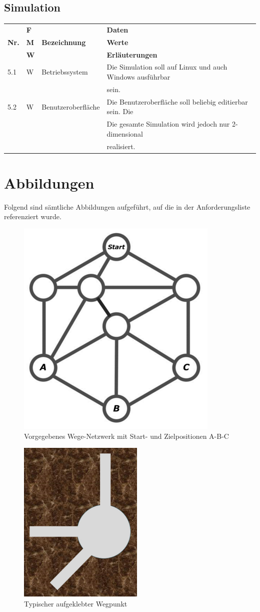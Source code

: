 \documentclass[11pt, a4paper]{article}
\begin{document}
\subsection{Simulation}
    \begin{tabular}{|l|l|l|l|}
    \hline
    & \textbf{F} & & \textbf{Daten} \\
    \textbf{Nr.} & \textbf{M} & \textbf{Bezeichnung} & \textbf{Werte} \\
    & \textbf{W} & & \textbf{Erläuterungen} \\
    \hline
    5.1 & W & Betriebssystem & Die Simulation soll auf Linux und auch Windows ausführbar \\
    & & & sein. \\
    \hline
    5.2 & W & Benutzeroberfläche & Die Benutzeroberfläche soll beliebig editierbar sein. Die \\
    & & & Die gesamte Simulation wird jedoch nur 2-dimensional \\
    & & & realisiert. \\
    \hline
    \end{tabular}


\section{Abbildungen}
Folgend sind sämtliche Abbildungen aufgeführt, auf die in der Anforderungsliste referenziert wurde.

\begin{figure} [ht]
    \centering
    \includegraphics[width=0.4\linewidth]{Images/WegeNetzwerk.png}
    \caption{Vorgegebenes Wege-Netzwerk mit Start- und Zielpositionen A-B-C}
    \label{fig:wege-netzwerk}
\end{figure}

\begin{figure} [ht]
    \centering
    \includegraphics[width=0.4\linewidth]{Images/Wegpunkt.png}
    \caption{Typischer aufgeklebter Wegpunkt}
    \label{fig:wegpunkt}
\end{figure}
\end{document}
